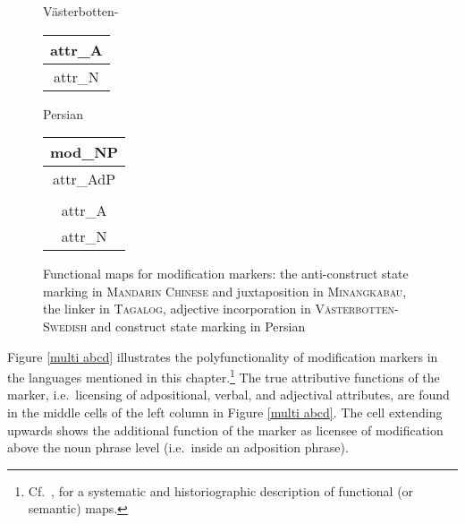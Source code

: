 \begin{figure}[htbp]
\begin{center}
{\begin{center}{\sc Västerbotten-}
\begin{tabular}{| c |}
{\sc attr}_{A}\\
\hline
{\sc attr}_{N}\\
\hline
\end{tabular}
\end{center}
}
\parbox[b]{0.20\textwidth}{
\begin{center}{\sc Persian}\\
\bigskip
\begin{tabular}{| c |}
\hline
{\sc mod}_{NP}\\
\hline
\hline
{\sc attr}_{AdP}\\
\hline
\\
\hline
{\sc attr}_{A}\\
\hline
{\sc attr}_{N}\\
\hline
\end{tabular}
\end{center}
}
\end{center}
\caption[Functional map for modification marking]{Functional maps for modification markers: the anti-construct state marking in \textsc{Mandarin Chinese} and juxtaposition in \textsc{Minangkabau}, the linker in \textsc{Tagalog}, adjective incorporation in \textsc{Västerbotten-Swedish} and construct state marking in {\sc Per\-si\-an}}
\end{figure}

\noindent Figure \ref{multi abcd} illustrates the polyfunctionality of modification markers in the languages mentioned in this chapter.\footnote{Cf.~\cite{haspelmath2003}, for a systematic and historiographic description of functional (or semantic) maps.} The true attributive functions of the marker, i.e.~licensing of adpositional, verbal, and adjectival attributes, are found in the middle cells of the left column in Figure \ref{multi abcd}. The cell extending upwards shows the additional function of the marker as licensee of modification above the noun phrase level (i.e.~inside an adposition phrase).%

